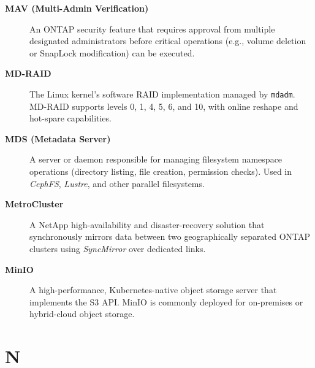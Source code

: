 \begin{description}

\item[\textbf{MAV (Multi-Admin Verification)}]
An ONTAP security feature that requires approval from multiple designated
administrators before critical operations (e.g., volume deletion or
SnapLock modification) can be executed.

\item[\textbf{MD-RAID}]
The Linux kernel's software RAID implementation managed by \texttt{mdadm}.
MD-RAID supports levels 0, 1, 4, 5, 6, and 10, with online reshape and
hot-spare capabilities.

\item[\textbf{MDS (Metadata Server)}]
A server or daemon responsible for managing filesystem namespace operations
(directory listing, file creation, permission checks). Used in
\textit{CephFS}, \textit{Lustre}, and other parallel filesystems.

\item[\textbf{MetroCluster}]
A NetApp high-availability and disaster-recovery solution that synchronously
mirrors data between two geographically separated ONTAP clusters using
\textit{SyncMirror} over dedicated links.

\item[\textbf{MinIO}]
A high-performance, Kubernetes-native object storage server that implements
the S3 API. MinIO is commonly deployed for on-premises or hybrid-cloud
object storage.

\end{description}

\section*{N}

